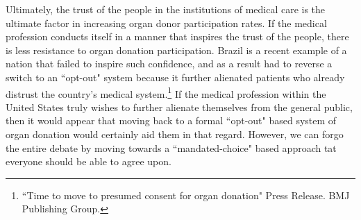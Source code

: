 \documentclass[letterpaper,10pt,twoside]{article}
\begin{document}
Ultimately, the trust of the people in the institutions of medical care is the ultimate factor in increasing organ donor participation rates.  If the medical profession conducts itself in a manner that inspires the trust of the people, there is less resistance to organ donation participation.  Brazil is a recent example of a nation that failed to inspire such confidence, and as a result had to reverse a switch to an ``opt-out" system because it further alienated patients who already distrust the country's medical system.\footnote{``Time to move to presumed consent for organ donation" Press Release. BMJ Publishing Group.}  If the medical profession within the United States truly wishes to further alienate themselves from the general public, then it would appear that moving back to a formal ``opt-out" based system of organ donation would certainly aid them in that regard.  However, we can forgo the entire debate by moving towards a ``mandated-choice" based approach tat everyone should be able to agree upon.
\end{document}
